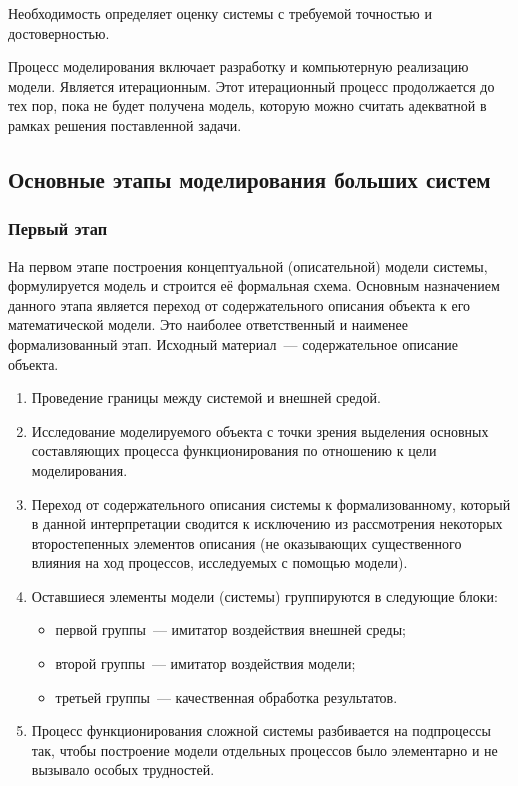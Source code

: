 Необходимость определяет оценку системы с требуемой точностью и достоверностью.

Процесс моделирования включает разработку и компьютерную реализацию модели. Является итерационным. Этот итерационный процесс продолжается до тех пор, пока не будет получена модель, которую можно считать адекватной в рамках решения поставленной задачи.

\subsection{Основные этапы моделирования больших систем}

\subsubsection{Первый этап}

На первом этапе построения концептуальной (описательной) модели системы, формулируется модель и строится её формальная схема. Основным назначением данного этапа является переход от содержательного описания объекта к его математической модели. Это наиболее ответственный и наименее формализованный этап. Исходный материал~--- содержательное описание объекта.

\begin{enumerate}
    \item Проведение границы между системой и внешней средой.
    \item Исследование моделируемого объекта с точки зрения выделения основных составляющих процесса функционирования по отношению к цели моделирования.
    \item Переход от содержательного описания системы к формализованному, который в данной интерпретации сводится к исключению из рассмотрения некоторых второстепенных элементов описания (не оказывающих существенного влияния на ход процессов, исследуемых с помощью модели).
    \item Оставшиеся элементы модели (системы) группируются в следующие блоки:
          \begin{itemize}
              \item первой группы~--- имитатор воздействия внешней среды;
              \item второй группы~--- имитатор воздействия модели;
              \item третьей группы~--- качественная обработка результатов.
          \end{itemize}
    \item Процесс функционирования сложной системы разбивается на подпроцессы так, чтобы построение модели отдельных процессов было элементарно и не вызывало особых трудностей.
\end{enumerate}

